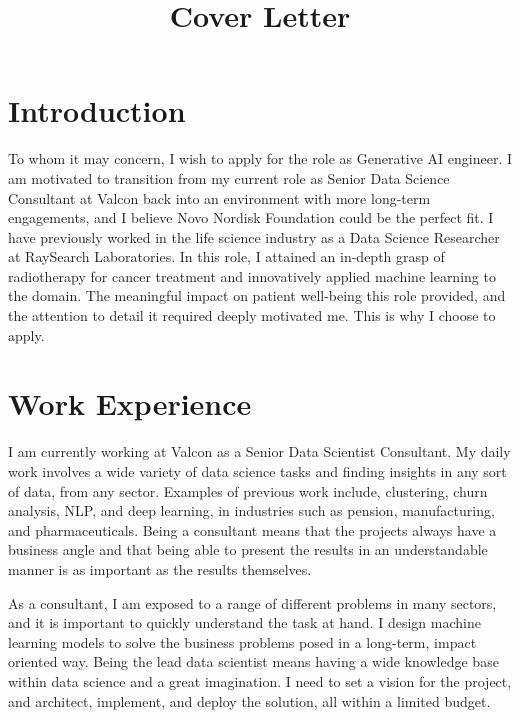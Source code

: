
\title{Cover Letter}



\newcommand{\role}{Generative AI engineer}
\newcommand{\company}{Novo Nordisk Foundation}


\makecvtitle


\section{Introduction}
To whom it may concern, I wish to apply for the role as \role{}.
I am motivated to transition from my current role as Senior Data Science Consultant at Valcon back into an environment with more long-term engagements, and I believe \company{} could be the perfect fit.
I have previously worked in the life science industry as a Data Science Researcher at RaySearch Laboratories.
In this role, I attained an in-depth grasp of radiotherapy for cancer treatment and innovatively applied machine learning to the domain.
The meaningful impact on patient well-being this role provided, and the attention to detail it required deeply motivated me.
This is why I choose to apply.

\section{Work Experience}
I am currently working at Valcon as a Senior Data Scientist Consultant.
My daily work involves a wide variety of data science tasks and finding insights in any sort of data, from any sector.
Examples of previous work include, clustering, churn analysis, NLP, and deep learning, in industries such as pension, manufacturing, and pharmaceuticals.
Being a consultant means that the projects always have a business angle and that being able to present the results in an understandable manner is as important as the results themselves.

\hspace{7 mm} As a consultant, I am exposed to a range of different problems in many sectors, and it is important to quickly understand the task at hand.
I design machine learning models to solve the business problems posed in a long-term, impact oriented way.
Being the lead data scientist means having a wide knowledge base within data science and a great imagination.
I need to set a vision for the project, and architect, implement, and deploy the solution, all within a limited budget.

